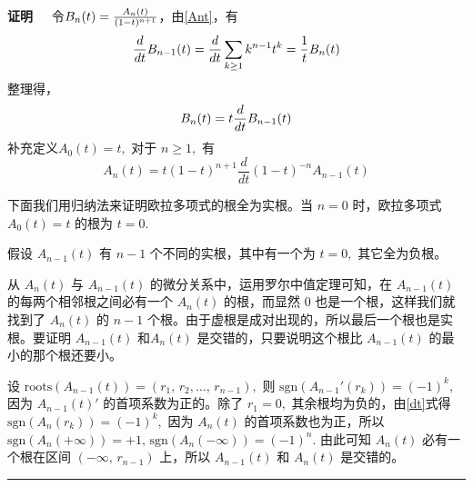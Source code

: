 \documentclass[a4paper,11pt]{article}
\def\qed{\nopagebreak\hfill{\rule{4pt}{7pt}}\medbreak}
\def\pf{{\bf 证明~~ }}
\def \roots{\mathrm{roots}}
\def \sgn{\mathrm{sgn}}
\begin{document}
\pf 令$B_n(t)={A_n(t)\over(1-t)^{n+1}}$，由\eqref{Ant}，有
$${d\over dt}B_{n-1}(t)={d\over dt}\sum_{k\geq1}k^{n-1}t^k={1\over t}B_n(t)
$$整理得，
$$B_n(t)=t{d\over dt}B_{n-1}(t)
$$
补充定义$A_0(t)=t,$ 对于 $n\geqslant 1,$ 有
\begin{equation}\label{dt}
A_{n}(t)=t(1-t)^{n+1}\frac{d}{dt}(1-t)^{-n}A_{n-1}(t)
\end{equation}

下面我们用归纳法来证明欧拉多项式的根全为实根。当 $n=0$
时，欧拉多项式 $A_0(t)=t$ 的根为 $t=0.$

假设 $A_{n-1}(t)$ 有 $n-1$ 个不同的实根，其中有一个为 $t=0,$
其它全为负根。

从 $A_{n}(t)$ 与 $A_{n-1}(t)$ 的微分关系中，运用罗尔中值定理可知，在
$A_{n-1} (t)$ 的每两个相邻根之间必有一个 $A_{n}(t)$ 的根，而显然 $0$
也是一个根，这样我们就找到了 $A_{n}(t)$ 的 $n- 1$
个根。由于虚根是成对出现的，所以最后一个根也是实根。要证明 $A_{n-1}
(t)$ 和$A_{n}(t)$ 是交错的，只要说明这个根比 $A_{n-1} (t)$
的最小的那个根还要小。

设
$\roots\left(A_{n-1}(t)\right)=\left(r_{1},\,r_2,\ldots,\,r_{n-1}\right),$
则 $\sgn (A_{n-1}'(r_k))=(-1)^k,$ 因为 $A_{n-1}(t)'$
的首项系数为正的。除了 $r_1=0,$ 其余根均为负的，由\eqref{dt}式得
$\sgn (A_{n}(r_k))=(-1)^k,$ 因为 $A_{n}(t)$ 的首项系数也为正，所以
$\sgn (A_{n}(+\infty))=+1,\,  \sgn (A_{n}(-\infty))=(-1)^{n}.$
由此可知 $A_{n}(t)$ 必有一个根在区间 $(-\infty,\,r_{n-1})$ 上，所以
$A_{n-1}(t)$ 和 $A_{n}(t)$ 是交错的。\qed
\end{document}
